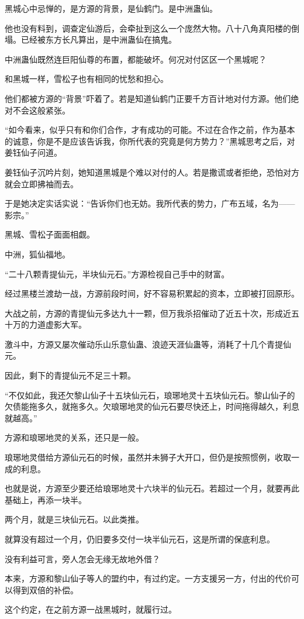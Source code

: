 \begin{this_body}
黑城心中忌惮的，是方源的背景，是仙鹤门。是中洲蛊仙。

他也没有料到，调查定仙游后，会牵扯到这么一个庞然大物。八十八角真阳楼的倒塌。已经被东方长凡算出，是中洲蛊仙在搞鬼。

中洲蛊仙既然连巨阳仙尊的布置，都能破坏。何况对付区区一个黑城呢？

和黑城一样，雪松子也有相同的忧愁和担心。

他们都被方源的“背景”吓着了。若是知道仙鹤门正要千方百计地对付方源。他们绝对不会这般紧张。

“如今看来，似乎只有和你们合作，才有成功的可能。不过在合作之前，作为基本的诚意，你是不是应该告诉我，你所代表的究竟是何方势力？”黑城思考之后，对姜钰仙子问道。

姜钰仙子沉吟片刻，她知道黑城是个难以对付的人。若是撒谎或者拒绝，恐怕对方就会立即拂袖而去。

于是她决定实话实说：“告诉你们也无妨。我所代表的势力，广布五域，名为——影宗。”

黑城、雪松子面面相觑。

中洲，狐仙福地。

“二十八颗青提仙元，半块仙元石。”方源检视自己手中的财富。

经过黑楼兰渡劫一战，方源前段时间，好不容易积累起的资本，立即被打回原形。

大战之前，方源的青提仙元多达九十一颗，但万我杀招催动了近五十次，形成近五十万的力道虚影大军。

激斗中，方源又屡次催动乐山乐意仙蛊、浪迹天涯仙蛊等，消耗了十几个青提仙元。

因此，剩下的青提仙元不足三十颗。

“不仅如此，我还欠黎山仙子十五块仙元石，琅琊地灵十五块仙元石。黎山仙子的欠债能拖多久，就拖多久。欠琅琊地灵的仙元石要尽快还上，时间拖得越久，利息就越高。”

方源和琅琊地灵的关系，还只是一般。

琅琊地灵借给方源仙元石的时候，虽然并未狮子大开口，但仍是按照惯例，收取一成的利息。

也就是说，方源至少要还给琅琊地灵十六块半的仙元石。若超过一个月，就要再此基础上，再添一块半。

两个月，就是三块仙元石。以此类推。

就算没有超过一个月，仍旧要多交付一块半仙元石，这是所谓的保底利息。

没有利益可言，旁人怎会无缘无故地外借？

本来，方源和黎山仙子等人的盟约中，有过约定。一方支援另一方，付出的代价可以得到双倍的补偿。

这个约定，在之前方源一战黑城时，就履行过。


\end{this_body}
